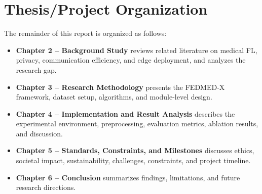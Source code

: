 \section{Thesis/Project Organization}
The remainder of this report is organized as follows:
\begin{itemize}[leftmargin=*]
  \item \textbf{Chapter 2 -- Background Study} reviews related literature on
        medical FL, privacy, communication efficiency, and edge deployment,
        and analyzes the research gap.
  \item \textbf{Chapter 3 -- Research Methodology} presents the FEDMED-X
        framework, dataset setup, algorithms, and module-level design.
  \item \textbf{Chapter 4 -- Implementation and Result Analysis} describes
        the experimental environment, preprocessing, evaluation metrics,
        ablation results, and discussion.
  \item \textbf{Chapter 5 -- Standards, Constraints, and Milestones}
        discusses ethics, societal impact, sustainability, challenges,
        constraints, and project timeline.
  \item \textbf{Chapter 6 -- Conclusion} summarizes findings, limitations,
        and future research directions.
\end{itemize}

